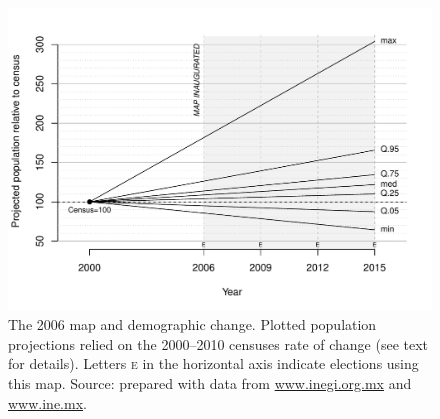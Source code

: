 \documentclass[letter,12pt]{article}
\begin{document}
\begin{figure}
\centering 
  \includegraphics[width=.8\columnwidth]{disRelPopProj2006map.pdf} 
  \caption{The 2006 map and demographic change. Plotted population projections relied on the 2000--2010 censuses rate of change (see text for details). Letters \textsc{e} in the horizontal axis indicate elections using this map. Source: prepared with data from \url{www.inegi.org.mx} and \url{www.ine.mx}.}\label{F:disRelPop2006map}
\end{figure}
\end{document}
